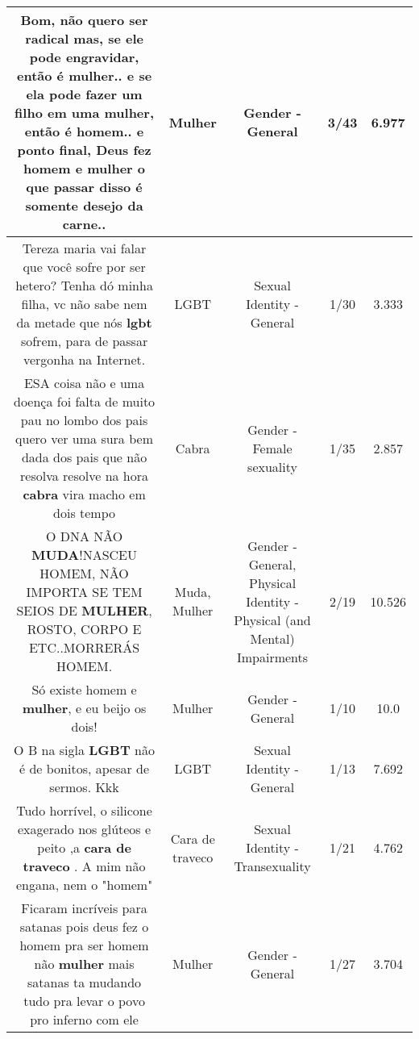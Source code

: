 \documentclass[11pt]{article}
\newlength\mylength
\begin{document}
\begin{center}
\begin{longtable}{|C{.65\mylength}|C{.30\mylength}|C{.12\mylength}|C{.12\mylength}|C{.12\mylength}|}
  \small Bom, não quero ser radical mas, se ele pode engravidar, então é \textbf{mulher}.. e se ela pode fazer um filho em uma \textbf{mulher}, então é homem.. e ponto final, Deus fez homem e \textbf{mulher} o que passar disso é somente desejo da carne..\normalsize   & Mulher & Gender - General & 3/43 & 6.977 \\  \hline
  \small Tereza maria vai falar que você sofre por ser hetero? Tenha dó minha filha, vc não sabe nem da metade que nós \textbf{lgbt} sofrem, para de passar vergonha na Internet.\normalsize   & LGBT & Sexual Identity - General & 1/30 & 3.333 \\  \hline
  \small ESA coisa não e uma doença  foi falta de muito pau no lombo dos pais quero ver uma sura bem dada dos pais que não resolva resolve na hora \textbf{cabra} vira macho em dois tempo\normalsize   & Cabra & Gender - Female sexuality & 1/35 & 2.857 \\  \hline
  \small O DNA NÃO \textbf{MUDA}!NASCEU HOMEM, NÃO IMPORTA SE TEM SEIOS DE \textbf{MULHER}, ROSTO, CORPO E ETC..MORRERÁS HOMEM.\normalsize   & Muda, Mulher & Gender - General, Physical Identity - Physical (and Mental) Impairments & 2/19 & 10.526 \\  \hline
  \small Só existe homem e \textbf{mulher}, e eu beijo os dois!\normalsize   & Mulher & Gender - General & 1/10 & 10.0 \\  \hline
  \small O B na sigla \textbf{LGBT} não é de bonitos, apesar de sermos. Kkk\normalsize   & LGBT & Sexual Identity - General & 1/13 & 7.692 \\  \hline
  \small Tudo horrível, o silicone exagerado nos glúteos e peito ,a \textbf{cara de traveco} . A mim não engana, nem o "homem"\normalsize   & Cara de traveco & Sexual Identity - Transexuality & 1/21 & 4.762 \\  \hline
  \small Ficaram incríveis para satanas pois deus fez o homem pra ser homem não \textbf{mulher} mais satanas ta mudando tudo pra levar o povo pro inferno com ele\normalsize   & Mulher & Gender - General & 1/27 & 3.704 \\  \hline

\end{longtable}
\end{center}
\end{document}

